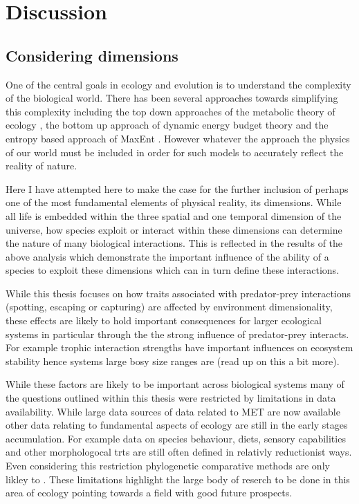 \chapter{Discussion}
\label{chap:discussion}


\section{Considering dimensions}

One of the central goals in ecology and evolution is to understand the complexity of the biological world. There has been several approaches towards simplifying this complexity including the top down approaches of the metabolic theory of ecology \citep{brown2004}, the bottom up approach of dynamic energy budget theory \citep{kooijman2009dynamic} and the entropy based approach of MaxEnt \citep{harte2008maximum}. However whatever the approach the physics of our world must be included in order for such models to accurately reflect the reality of nature. 


Here I have attempted here to make the case for the further inclusion of perhaps one of the most fundamental elements of physical reality, its dimensions. While all life is embedded within the three spatial and one temporal dimension of the universe, how species exploit or interact within these dimensions can determine the nature of many biological interactions. This is reflected in the results of the above analysis which demonstrate the important influence of the ability of a species to exploit these dimensions which can in turn define these interactions. 


While this thesis focuses on how traits associated with predator-prey interactions (spotting, escaping or capturing) are affected by environment dimensionality, these effects are likely to hold important consequences for larger ecological systems in particular through the the strong influence of predator-prey interacts. For example trophic interaction strengths have important influences on ecosystem stability hence systems large bosy size ranges are (read up on this a bit more).


While these factors are likely to be important across biological systems many of the questions outlined within this thesis were restricted by limitations in data availability. While large data sources of data related to MET are now available other data relating to fundamental aspects of ecology are still in the early stages accumulation. For example data on species behaviour, diets, sensory capabilities and other morphologocal trts are still often defined in relativly reductionist ways. Even considering this restriction phylogenetic comparative methods are only likley to . These limitations highlight the large body of reserch to be done in this area of ecology pointing towards a field with good future prospects.

